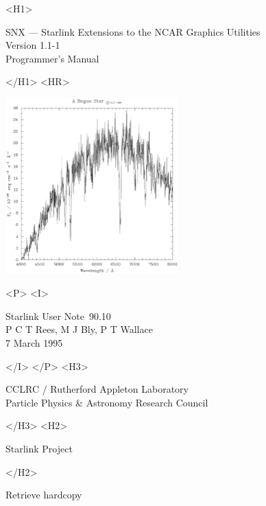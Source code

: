 \documentclass[twoside,11pt]{article}
\newcommand{\stardoccategory}  {Starlink User Note}
\newcommand{\stardocsource}    {sun\stardocnumber}
\newcommand{\stardocnumber}    {90.10}
\newcommand{\stardocauthors}   {P C T Rees, M J Bly,  P T Wallace}
\newcommand{\stardocdate}      {7 March 1995}
\newcommand{\stardoctitle}     {SNX --- Starlink Extensions to
                                the NCAR Graphics Utilities}
\newcommand{\stardocversion}   {Version 1.1-1}
\newcommand{\stardocmanual}    {Programmer's Manual}
\newcommand{\htmladdnormallink}[2]{#1}
\newcommand{\htmladdimg}[1]{}
\newcommand{\xlabel}[1]{}
\renewcommand{\_}{\texttt{\symbol{95}}}
\begin{document}
\begin{htmlonly}
   \xlabel{}
   \begin{rawhtml} <H1> \end{rawhtml}
      \stardoctitle\\
      \stardocversion\\
      \stardocmanual
   \begin{rawhtml} </H1> <HR> \end{rawhtml}

    \includegraphics[width=0.5\textwidth]{sun90-fig-1}

   \begin{rawhtml} <P> <I> \end{rawhtml}
   \stardoccategory\ \stardocnumber \\
   \stardocauthors \\
   \stardocdate
   \begin{rawhtml} </I> </P> <H3> \end{rawhtml}
      \htmladdnormallink{CCLRC / Rutherford Appleton Laboratory}
                        {http://www.cclrc.ac.uk} \\
      \htmladdnormallink{Particle Physics \& Astronomy Research Council}
                        {http://www.pparc.ac.uk} \\
   \begin{rawhtml} </H3> <H2> \end{rawhtml}
      \htmladdnormallink{Starlink Project}{http://www.starlink.ac.uk/}
   \begin{rawhtml} </H2> \end{rawhtml}
   \htmladdnormallink{\htmladdimg{source.gif} Retrieve hardcopy}
      {http://www.starlink.ac.uk/cgi-bin/hcserver?\stardocsource}\\


\end{htmlonly}
\end{document}
